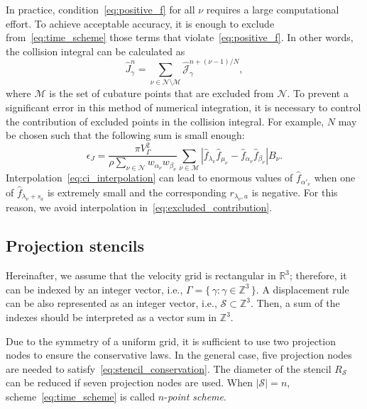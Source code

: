 \documentclass[]{elsarticle} %
\newcommand{\Nu}{\mathcal{N}}
\newcommand{\Mu}{\mathcal{M}}
\newcommand{\Set}[2]{\{\,{#1}:{#2}\,\}}
\begin{document}
In practice, condition~\eqref{eq:positive_f} for all \(\nu\) requires a large computational effort.
To achieve acceptable accuracy, it is enough to exclude from~\eqref{eq:time_scheme} those terms
that violate~\eqref{eq:positive_f}. In other words, the collision integral can be calculated as
\begin{equation}\label{eq:discrete_short_ci_discarded}
    \hat{J}_\gamma^n = \sum_{\nu\in\Nu\setminus\Mu} \hat{\mathscr{J}}_\gamma^{n+(\nu-1)/N},
\end{equation}
where \(\Mu\) is the set of cubature points that are excluded from \(\Nu\).
To prevent a significant error in this method of numerical integration,
it is necessary to control the contribution of excluded points in the collision integral.
For example, \(N\) may be chosen such that the following sum is small enough:
\begin{equation}\label{eq:excluded_contribution}
    \epsilon_J = \frac{\pi V_\Gamma^2}{\rho\sum_{\nu\in\Nu} w_{\alpha_\nu}w_{\beta_\nu}}
        \sum_{\nu\in\Mu} \left|
            \hat{f}_{\lambda_\nu}\hat{f}_{\mu_\nu} - \hat{f}_{\alpha_\nu}\hat{f}_{\beta_\nu}
        \right|B_\nu.
\end{equation}
Interpolation~\eqref{eq:ci_interpolation} can lead to enormous values of \(\hat{f}_{\alpha'_\nu}\)
when one of \(\hat{f}_{\lambda_\nu+s_a}\) is extremely small and the corresponding \(r_{\lambda_\nu,a}\) is negative.
For this reason, we avoid interpolation in~\eqref{eq:excluded_contribution}.

\subsection{Projection stencils}

Hereinafter, we assume that the velocity grid is rectangular in \(\mathbb{R}^3\);
therefore, it can be indexed by an integer vector, i.e., \(\Gamma = \Set{\gamma}{\gamma\in\mathbb{Z}^3}\).
A displacement rule can be also represented as an integer vector, i.e., \(\mathcal{S}\subset\mathbb{Z}^3\).
Then, a sum of the indexes should be interpreted as a vector sum in \(\mathbb{Z}^3\).

Due to the symmetry of a uniform grid,
it is sufficient to use two projection nodes to ensure the conservative laws.
In the general case, five projection nodes are needed to satisfy~\eqref{eq:stencil_conservation}.
The diameter of the stencil \(R_\mathcal{S}\) can be reduced if seven projection nodes are used.
When \(|\mathcal{S}|=n\), scheme~\eqref{eq:time_scheme} is called \(n\)-\emph{point scheme}.
\end{document}
